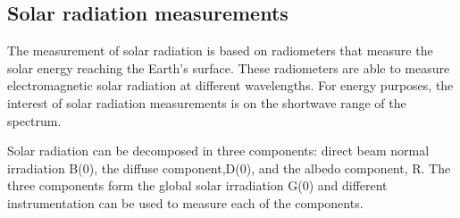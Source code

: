 \subsection{Solar radiation measurements}%

The measurement of solar radiation is based on radiometers that measure the solar energy reaching the Earth's surface. These radiometers are able to measure electromagnetic solar radiation at different wavelengths. For energy purposes, the interest of solar radiation measurements is on the shortwave range of the spectrum.

Solar radiation can be decomposed in three components: direct beam normal irradiation B(0), the diffuse component,D(0), and the albedo component, R. The three components form the global solar irradiation G(0) and different instrumentation can be used to measure each of the components.





